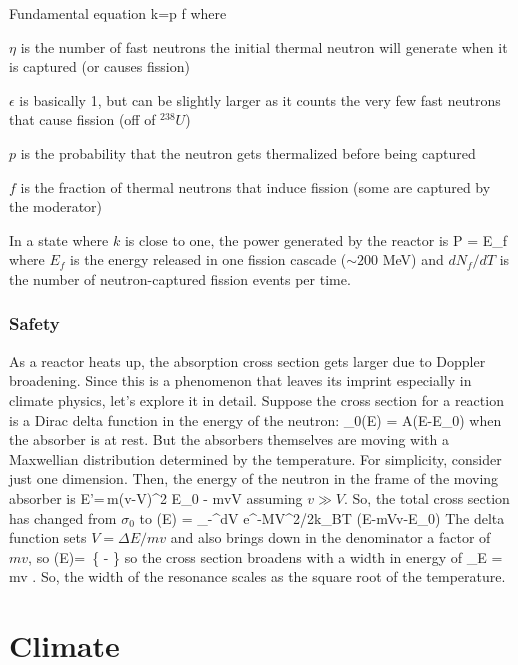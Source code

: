 \documentclass[11pt]{book}
\begin{document}
Fundamental equation
\be
k=\eta\epsilon p f
\ee
where
\bei
\item $\eta$ is the number of fast neutrons the initial thermal neutron will generate when it is captured (or causes fission)
\item $\epsilon$ is basically 1, but can be slightly larger as it counts the very few fast neutrons that cause fission (off of $^{238}U$)
\item $p$ is the probability that the neutron gets thermalized before being captured 
\item $f$ is the fraction of thermal neutrons that induce fission (some are captured by the moderator)
\eei

In a state where $k$ is close to one, the power generated by the reactor is
\be
P = E_f 
\ee
where $E_f$ is the energy released in one fission cascade ($\sim200$ MeV) and $dN_f/dT$ is the number of neutron-captured fission events per time. 

\subsection{Safety}

As a reactor heats up, the absorption cross section gets larger due to Doppler broadening. Since this is a phenomenon that leaves its imprint especially in climate physics, let's explore it in detail. Suppose the cross section for a reaction is a Dirac delta function in the energy of the neutron:
\be
\sigma_0(E) = A\delta(E-E_0)
\ee
when the absorber is at rest. But the absorbers themselves are moving with a Maxwellian distribution determined by the temperature. For simplicity, consider just one dimension. Then, the energy of the neutron in the frame of the moving absorber is 
\be
E'=\,m(v-V)^2 \simeq E_0 - mvV
\ee
assuming $v\gg V$. So, the total cross section has changed from
$\sigma_0 $
to
\be
\sigma(E) =  \int_{-\infty}^\infty dV e^{-MV^2/2k_BT} \delta(E-mVv-E_0)
\ee
The delta function sets $V=\Delta E/mv$ and also brings down in the denominator a factor of $mv$, so
\be
\sigma(E)=  \,\exp\left\{ - \right\}
\ee
so the cross section broadens with a width in energy of \be
\sigma_E = mv .\ee
So, the width of the resonance scales as the square root of the temperature.

\chapter{Climate}
\end{document}
